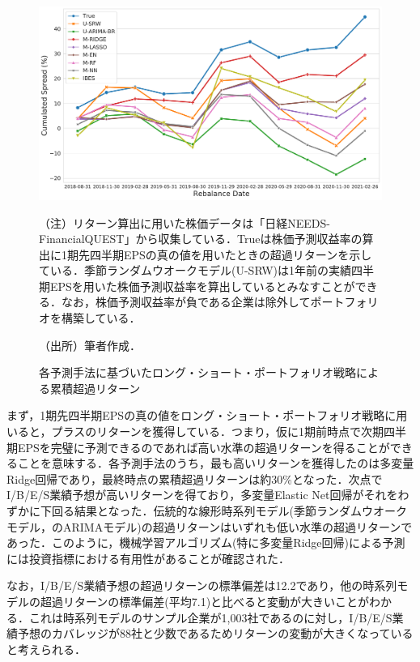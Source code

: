 \documentclass[a4paper，11pt]{jsarticle}
\begin{document}
\begin{figure}[tbp]
  \centering
  \caption{各予測手法に基づいたロング・ショート・ポートフォリオ戦略による累積超過リターン}
  \label{fig:portfolio_return}
  \includegraphics[width=\linewidth]{./img/_portfolio_return.pdf}
  \begin{threeparttable}
  \begin{tablenotes}
    \item[]（注）リターン算出に用いた株価データは「日経NEEDS-FinancialQUEST」から収集している．Trueは株価予測収益率の算出に1期先四半期EPSの真の値を用いたときの超過リターンを示している．季節ランダムウオークモデル(U-SRW)は1年前の実績四半期EPSを用いた株価予測収益率を算出しているとみなすことができる．なお，株価予測収益率が負である企業は除外してポートフォリオを構築している．
    \item[]（出所）筆者作成．
  \end{tablenotes}
  \end{threeparttable}
\end{figure}

まず，1期先四半期EPSの真の値をロング・ショート・ポートフォリオ戦略に用いると，プラスのリターンを獲得している．つまり，仮に1期前時点で次期四半期EPSを完璧に予測できるのであれば高い水準の超過リターンを得ることができることを意味する．各予測手法のうち，最も高いリターンを獲得したのは多変量Ridge回帰であり，最終時点の累積超過リターンは約30\%となった．次点でI/B/E/S業績予想が高いリターンを得ており，多変量Elastic Net回帰がそれをわずかに下回る結果となった．伝統的な線形時系列モデル(季節ランダムウオークモデル，\cite{brown1979univariate}のARIMAモデル)の超過リターンはいずれも低い水準の超過リターンであった．このように，機械学習アルゴリズム(特に多変量Ridge回帰)による予測には投資指標における有用性があることが確認された．

なお，I/B/E/S業績予想の超過リターンの標準偏差は12.2であり，他の時系列モデルの超過リターンの標準偏差(平均7.1)と比べると変動が大きいことがわかる．これは時系列モデルのサンプル企業が1,003社であるのに対し，I/B/E/S業績予想のカバレッジが88社と少数であるためリターンの変動が大きくなっていると考えられる．
\end{document}
